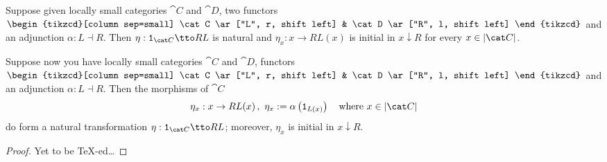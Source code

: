 \begin{proposition}
Suppose given locally small categories \(\cat C\) and \(\cat D\), two functors
\(\begin{tikzcd}[column sep=small]
\cat C \ar["L", r, shift left] & \cat D \ar["R", l, shift left]
\end{tikzcd}\)
and an adjunction \(\alpha : L \dashv R\). Then \(\eta : \id_{\cat C} \tto RL\) is natural and \(\eta_x : x \to RL(x)\) is initial in \(x {\downarrow} R\) for every \(x \in \obj{\cat C}\).
\end{proposition}

\begin{proposition}
Suppose now you have locally small categories \(\cat C\) and \(\cat D\), functors
\(\begin{tikzcd}[column sep=small]
\cat C \ar["L", r, shift left] & \cat D \ar["R", l, shift left]
\end{tikzcd}\) and an adjunction \(\alpha : L \dashv R\).%
Then the morphisms of \(\cat C\)
\[\eta_x : x \to RL(x)\,, \ \eta_x := \alpha\left(\id_{L(x)}\right) \quad\text{where } x \in \obj{\cat C}\]
do form a natural transformation \(\eta : \id_{\cat C} \tto RL\); moreover, \(\eta_x\) is initial in \(x {\downarrow} R\).
\end{proposition}

\begin{proof}
Yet to be \TeX{}-ed\dots{}
\end{proof}
